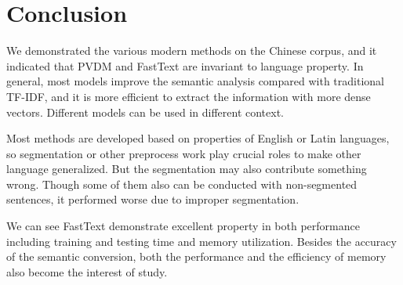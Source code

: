 \chapter{Conclusion}

We demonstrated the various modern methods on the Chinese corpus, and it indicated that PVDM and FastText are invariant to language property. 
In general, most models improve the semantic analysis compared with traditional TF-IDF, and it is more efficient to extract the information with more dense vectors.
Different models can be used in different context.

Most methods are developed based on properties of English or Latin languages, so segmentation or other preprocess work play crucial roles to make other language generalized.
But the segmentation may also contribute something wrong. Though some of them also can be conducted with non-segmented sentences, it performed worse due to improper segmentation.

We can see FastText demonstrate excellent property in both performance including training and testing time and memory utilization. 
Besides the accuracy of the semantic conversion, both the performance and the efficiency of memory also become the interest of study.

